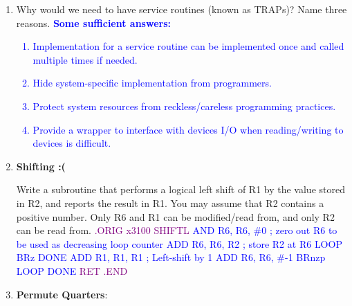 \documentclass{article}
\begin{document}
\begin{enumerate}[label=(\alph*)]

\item Why would we need to have service routines (known as TRAPs)? Name three reasons.
\newline
\textcolor{blue}{
\textbf{Some sufficient answers:}
}
\textcolor{blue}{
    \begin{enumerate}[label=\color{blue}\roman*.]
        \item Implementation for a service routine can be implemented once and called multiple times if needed.
        \item Hide system-specific implementation from programmers.
        \item Protect system resources from reckless/careless programming practices.
        \item Provide a wrapper to interface with devices I/O when reading/writing to devices is difficult.
    \end{enumerate}
}

    \item \textbf{Shifting :(}

    Write a subroutine that performs a logical left shift of R1 by the value stored in R2, and reports the result in R1. You may assume that R2 contains a positive number. Only R6 and R1 can be modified/read from, and only R2 can be read from.
    \newpage
    \textcolor{purple}{.ORIG x3100}
    \newline
    \textcolor{purple}{SHIFTL}
    \newline
    \textcolor{blue}{AND R6, R6, \#0  ; zero out R6 to be used as decreasing loop counter
}
    \newline
    \textcolor{blue}{ADD R6, R6, R2 ; store R2 at R6}
    \newline
    \textcolor{blue}{LOOP BRz DONE}
    \newline
    \textcolor{blue}{ADD R1, R1, R1 ; Left-shift by 1}
    \newline
    \textcolor{blue}{ADD R6, R6, \#-1}
    \newline
    \textcolor{blue}{BRnzp LOOP}
    \newline
    \textcolor{blue}{DONE}
    \newline
    \textcolor{purple}{RET}
    \newline
    \textcolor{purple}{.END}



    \item  \textbf{Permute Quarters}:


\end{enumerate}
\end{document}
